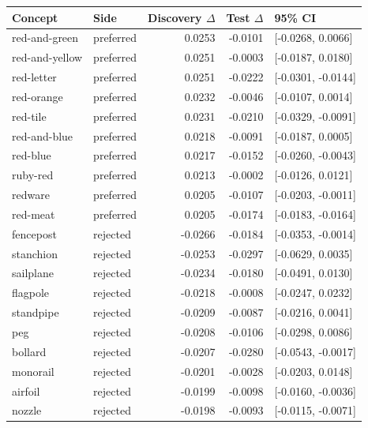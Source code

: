 \begin{tabular}{llrrl}
\toprule
Concept & Side & Discovery $\Delta$ & Test $\Delta$ & 95\% CI \\
\midrule
red-and-green & preferred & 0.0253 & -0.0101 & [-0.0268, 0.0066] \\
red-and-yellow & preferred & 0.0251 & -0.0003 & [-0.0187, 0.0180] \\
red-letter & preferred & 0.0251 & -0.0222 & [-0.0301, -0.0144] \\
red-orange & preferred & 0.0232 & -0.0046 & [-0.0107, 0.0014] \\
red-tile & preferred & 0.0231 & -0.0210 & [-0.0329, -0.0091] \\
red-and-blue & preferred & 0.0218 & -0.0091 & [-0.0187, 0.0005] \\
red-blue & preferred & 0.0217 & -0.0152 & [-0.0260, -0.0043] \\
ruby-red & preferred & 0.0213 & -0.0002 & [-0.0126, 0.0121] \\
redware & preferred & 0.0205 & -0.0107 & [-0.0203, -0.0011] \\
red-meat & preferred & 0.0205 & -0.0174 & [-0.0183, -0.0164] \\
fencepost & rejected & -0.0266 & -0.0184 & [-0.0353, -0.0014] \\
stanchion & rejected & -0.0253 & -0.0297 & [-0.0629, 0.0035] \\
sailplane & rejected & -0.0234 & -0.0180 & [-0.0491, 0.0130] \\
flagpole & rejected & -0.0218 & -0.0008 & [-0.0247, 0.0232] \\
standpipe & rejected & -0.0209 & -0.0087 & [-0.0216, 0.0041] \\
peg & rejected & -0.0208 & -0.0106 & [-0.0298, 0.0086] \\
bollard & rejected & -0.0207 & -0.0280 & [-0.0543, -0.0017] \\
monorail & rejected & -0.0201 & -0.0028 & [-0.0203, 0.0148] \\
airfoil & rejected & -0.0199 & -0.0098 & [-0.0160, -0.0036] \\
nozzle & rejected & -0.0198 & -0.0093 & [-0.0115, -0.0071] \\
\bottomrule
\end{tabular}
